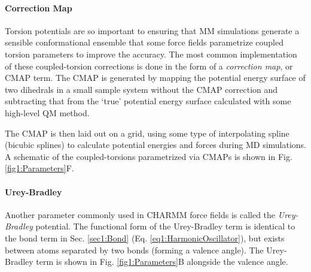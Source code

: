 \paragraph{Correction Map}

Torsion potentials are so important to ensuring that MM simulations generate a
sensible conformational ensemble that some force fields parametrize coupled
torsion parameters to improve the accuracy. The most common implementation of
these coupled-torsion corrections is done in the form of a \emph{correction
map}, or CMAP term. \cite{MacKerell_JComputChem_2004_v25_p1400} The CMAP is
generated by mapping the potential energy surface of two dihedrals in a small
sample system without the CMAP correction and subtracting that from the `true'
potential energy surface calculated with some high-level QM method.

The CMAP is then laid out on a grid, using some type of interpolating spline
(\eg bicubic splines) to calculate potential energies and forces during MD
simulations. A schematic of the coupled-torsions parametrized via CMAPs is shown
in Fig. \ref{fig1:Parameters}F.

\paragraph{Urey-Bradley}

Another parameter commonly used in CHARMM force fields
\cite{MacKerell_JPhysChemB_1998_v102_p3586} is called the \emph{Urey-Bradley}
potential. The functional form of the Urey-Bradley term is identical to the
bond term in Sec. \ref{sec1:Bond} (Eq. \ref{eq1:HarmonicOscillator}), but exists
between atoms separated by two bonds (\ie forming a valence angle). The
Urey-Bradley term is shown in Fig. \ref{fig1:Parameters}B alongside the valence
angle.

